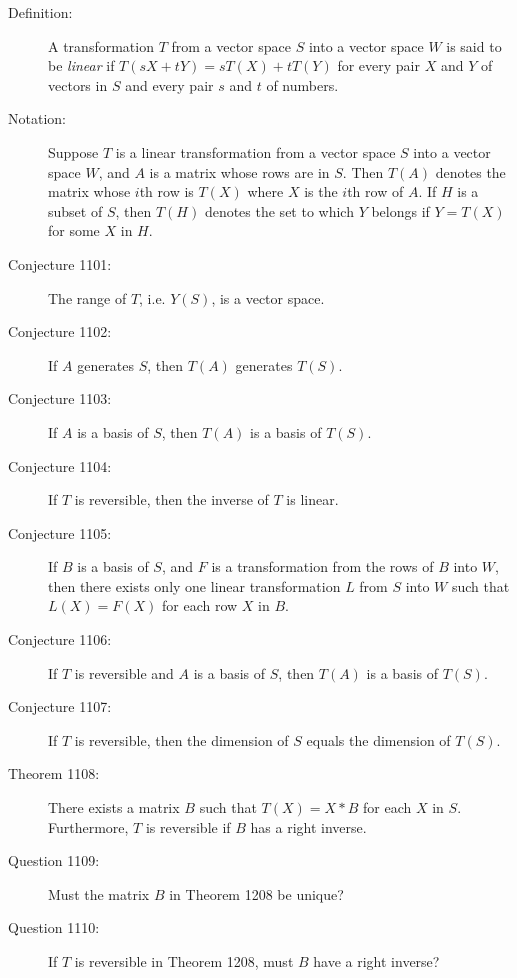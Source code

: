 \documentclass{article}
\begin{document}
\begin{description}

  \item[Definition:] A transformation $T$ from a vector space $S$ into a vector space $W$ is said to be \emph{linear} if $T(sX+tY)=sT(X)+tT(Y)$ for every pair $X$ and $Y$ of vectors in $S$ and every pair $s$ and $t$ of numbers.

  \item[Notation:] Suppose $T$ is a linear transformation from a vector space $S$ into a vector space $W$, and $A$ is a matrix whose rows are in $S$. Then $T(A)$ denotes the matrix whose $i$th row is $T(X)$ where $X$ is the $i$th row of $A$. If $H$ is a subset of $S$, then $T(H)$ denotes the set to which $Y$ belongs if $Y=T(X)$ for some $X$ in $H$.

  \item[Conjecture 1101:] The range of $T$, i.e. $Y(S)$, is a vector space.

  \item[Conjecture 1102:] If $A$ generates $S$, then $T(A)$ generates $T(S)$.

  \item[Conjecture 1103:] If $A$ is a basis of $S$, then $T(A)$ is a basis of $T(S)$.

  \item[Conjecture 1104:] If $T$ is reversible, then the inverse of $T$ is linear.

  \item[Conjecture 1105:] If $B$ is a basis of $S$, and $F$ is a transformation from the rows of $B$ into $W$, then there exists only one linear transformation $L$ from $S$ into $W$ such that $L(X)=F(X)$ for each row $X$ in $B$.

  \item[Conjecture 1106:] If $T$ is reversible and $A$ is a basis of $S$, then $T(A)$ is a basis of $T(S)$.

  \item[Conjecture 1107:] If $T$ is reversible, then the dimension of $S$ equals the dimension of $T(S)$.

  \item[Theorem 1108:] There exists a matrix $B$ such that $T(X)=X*B$ for each $X$ in $S$. Furthermore, $T$ is reversible if $B$ has a right inverse.

  \item[Question 1109:] Must the matrix $B$ in Theorem 1208 be unique?

  \item[Question 1110:] If $T$ is reversible in Theorem 1208, must $B$ have a right inverse?

\end{description}
\end{document}
